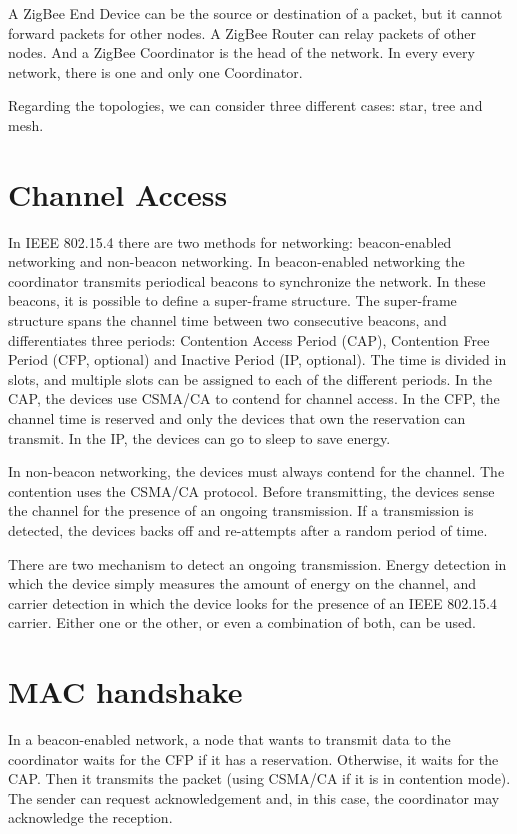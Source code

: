 A ZigBee End Device can be the source or destination of a packet, but it cannot forward packets for other nodes.
A ZigBee Router can relay packets of other nodes.
And a ZigBee Coordinator is the head of the network.
In every every network, there is one and only one Coordinator.

Regarding the topologies, we can consider three different cases: star, tree and mesh.

\section{Channel Access}

In IEEE 802.15.4 there are two methods for networking: beacon-enabled networking and non-beacon networking.
In beacon-enabled networking the coordinator transmits periodical beacons to synchronize the network.
In these beacons, it is possible to define a super-frame structure.
The super-frame structure spans the channel time between two consecutive beacons, and differentiates three periods: Contention Access Period (CAP), Contention Free Period (CFP, optional) and Inactive Period (IP, optional).
The time is divided in slots, and multiple slots can be assigned to each of the different periods.
In the CAP, the devices use CSMA/CA to contend for channel access.
In the CFP, the channel time is reserved and only the devices that own the reservation can transmit.
In the IP, the devices can go to sleep to save energy.

In non-beacon networking, the devices must always contend for the channel.
The contention uses the CSMA/CA protocol.
Before transmitting, the devices sense the channel for the presence of an ongoing transmission.
If a transmission is detected, the devices backs off and re-attempts after a random period of time.

There are two mechanism to detect an ongoing transmission.
Energy detection in which the device simply measures the amount of energy on the channel,
and carrier detection in which the device looks for the presence of an IEEE 802.15.4 carrier.
Either one or the other, or even a combination of both, can be used.

\section{MAC handshake}

In a beacon-enabled network, a node that wants to transmit data to the coordinator waits for the CFP if it has a reservation.
Otherwise, it waits for the CAP.
Then it transmits the packet (using CSMA/CA if it is in contention mode).
The sender can request acknowledgement and, in this case, the coordinator may acknowledge the reception.

